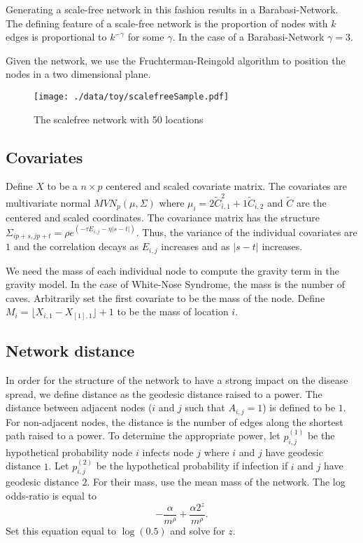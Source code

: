 \documentclass[11pt]{article}
\begin{document}
Generating a scale-free network in this fashion results in a
Barabasi-Network.  The defining feature of a scale-free network is the
proportion of nodes with $k$ edges is proportional to $k^{-\gamma}$
for some $\gamma$.  In the case of a Barabasi-Network $\gamma = 3$.

Given the network, we use the Fruchterman-Reingold algorithm to
position the nodes in a two dimensional plane.


\begin{figure}[htb]
\centering
\texttt{[image: ./data/toy/scalefreeSample.pdf]}
\caption{\label{fig:scalefree25}The scalefree network with 50 locations}
\end{figure}




\subsection{Covariates}
\label{sec-3-2}

Define $X$ to be a $n \times p$ centered and scaled covariate matrix.
The covariates are multivariate normal $MVN_p(\mu,\Sigma)$ where
$\mu_i = 2\widetilde{C}_{i,1}^2 + 1\widetilde{C}_{i,2}$ and
$\widetilde{C}$ are the centered and scaled coordinates.  The
covariance matrix has the structure $\Sigma_{ip + s, jp + t} =
\rho e^{(-\tau  E_{i,j} - \eta |s-t|)}$.  Thus, the variance of the
individual covariates are $1$ and the correlation decays as $E_{i,j}$
increases and as $|s-t|$ increases.

We need the mass of each individual node to compute the gravity term
in the gravity model.  In the case of White-Nose Syndrome, the mass is
the number of caves.  Arbitrarily set the first covariate to be the
mass of the node.  Define $M_i = \lfloor X_{i,1} - X_{[1],1} \rfloor +
1$ to be the mass of location $i$.


\subsection{Network distance}
\label{sec-3-3}

In order for the structure of the network to have a strong impact on
the disease spread, we define distance as the geodesic distance raised
to a power.  The distance between adjacent nodes ($i$ and $j$ such
that $A_{i,j} = 1$) is defined to be $1$.  For non-adjacent nodes, the
distance is the number of edges along the shortest path raised to a
power.  To determine the appropriate power, let $p^{(1)}_{i,j}$ be the
hypothetical probability node $i$ infects node $j$ where $i$ and $j$
have geodesic distance $1$.  Let $p^{(2)}_{i,j}$ be the hypothetical
probability if infection if $i$ and $j$ have geodesic distance $2$.
For their mass, use the mean mass of the network.  The log odds-ratio
is equal to
\begin{equation*}
  - \frac{\alpha}{m^\rho} + \frac{\alpha2^z}{m^\rho}.
\end{equation*}
Set this equation equal to $\log(0.5)$ and solve for $z$.
\end{document}

